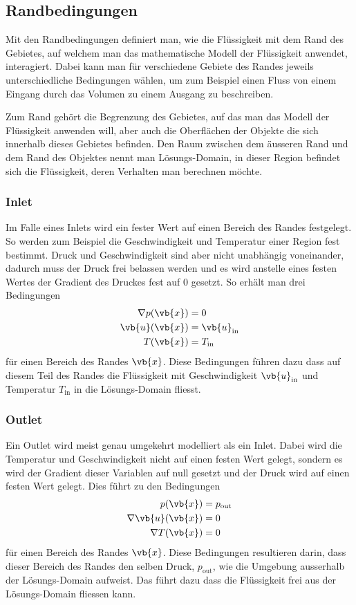 \subsection{Randbedingungen}
\label{openfoam:randbedingungen}
Mit den Randbedingungen definiert man, wie die Flüssigkeit mit dem Rand des Gebietes, auf welchem man das mathematische Modell der Flüssigkeit anwendet, interagiert.
Dabei kann man für verschiedene Gebiete des Randes jeweils unterschiedliche Bedingungen wählen, um zum Beispiel einen Fluss von einem Eingang durch das Volumen zu einem Ausgang zu beschreiben.

Zum Rand gehört die Begrenzung des Gebietes, auf das man das Modell der Flüssigkeit anwenden will, aber auch die Oberflächen der Objekte die sich innerhalb dieses Gebietes befinden.
Den Raum zwischen dem äusseren Rand und dem Rand des Objektes nennt man Lösungs-Domain, in dieser Region befindet sich die Flüssigkeit, deren Verhalten man berechnen möchte.

\subsubsection{Inlet}
Im Falle eines Inlets wird ein fester Wert auf einen Bereich des Randes festgelegt. 
So werden zum Beispiel die Geschwindigkeit und Temperatur einer Region fest bestimmt.
Druck und Geschwindigkeit sind aber nicht unabhängig voneinander, dadurch muss der Druck frei belassen werden und es wird anstelle eines festen Wertes der Gradient des Druckes fest auf 0 gesetzt.
So erhält man drei Bedingungen 
\begin{align*}
 \nabla p(\vb{x}) &= 0 \\
 \vb{u}(\vb{x}) &= \vb{u}_{\text{in}} \\
 T(\vb{x}) &= T_{\text{in}}
\end{align*}
für einen Bereich des Randes $\vb{x}$.
Diese Bedingungen führen dazu dass auf diesem Teil des Randes die Flüssigkeit mit Geschwindigkeit $\vb{u}_{\text{in}}$ und Temperatur $T_{\text{in}}$ in die Lösungs-Domain fliesst.

\subsubsection{Outlet}
Ein Outlet wird meist genau umgekehrt modelliert als ein Inlet.
Dabei wird die Temperatur und Geschwindigkeit nicht auf einen festen Wert gelegt, sondern es wird der Gradient dieser Variablen auf null gesetzt und der Druck wird auf einen festen Wert gelegt.
Dies führt zu den Bedingungen
\begin{align*}
 p(\vb{x}) &= p_{\text{out}} \\
 \nabla\vb{u}(\vb{x}) &= 0 \\
 \nabla T(\vb{x}) &= 0
\end{align*}
für einen Bereich des Randes $\vb{x}$.
Diese Bedingungen resultieren darin, dass dieser Bereich des Randes den selben Druck, $p_{\text{out}}$,  wie die Umgebung ausserhalb der Lösungs-Domain aufweist.
Das führt dazu dass die Flüssigkeit frei aus der Lösungs-Domain fliessen kann.

